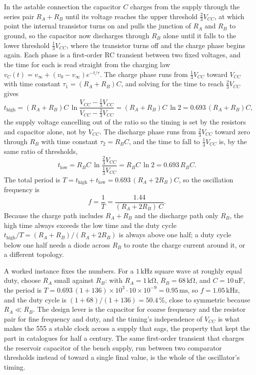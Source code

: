

In the astable connection the capacitor $C$ charges from the supply
through the series pair $R_A + R_B$ until its voltage reaches the upper
threshold $\tfrac{2}{3}V_{CC}$, at which point the internal transistor
turns on and pulls the junction of $R_A$ and $R_B$ to ground, so the
capacitor now discharges through $R_B$ alone until it falls to the lower
threshold $\tfrac{1}{3}V_{CC}$, where the transistor turns off and the
charge phase begins again. Each phase is a first-order RC transient
between two fixed voltages, and the time for each is read straight from
the charging law $v_C(t) = v_\infty + (v_0 - v_\infty)e^{-t/\tau}$. The
charge phase runs from $\tfrac{1}{3}V_{CC}$ toward $V_{CC}$ with time
constant $\tau_1 = (R_A + R_B)C$, and solving for the time to reach
$\tfrac{2}{3}V_{CC}$ gives
\[
t_{\text{high}} = (R_A + R_B)C\,\ln\!\frac{V_{CC} - \tfrac{1}{3}V_{CC}}
{V_{CC} - \tfrac{2}{3}V_{CC}}
= (R_A + R_B)C\,\ln 2 = 0.693\,(R_A + R_B)C,
\]
the supply voltage cancelling out of the ratio so the timing is set by the
resistors and capacitor alone, not by $V_{CC}$. The discharge phase runs
from $\tfrac{2}{3}V_{CC}$ toward zero through $R_B$ with time constant
$\tau_2 = R_B C$, and the time to fall to $\tfrac{1}{3}V_{CC}$ is, by the
same ratio of thresholds,
\[
t_{\text{low}} = R_B C\,\ln\!\frac{\tfrac{2}{3}V_{CC}}{\tfrac{1}{3}V_{CC}}
= R_B C\,\ln 2 = 0.693\,R_B C.
\]
The total period is $T = t_{\text{high}} + t_{\text{low}} = 0.693\,(R_A +
2R_B)C$, so the oscillation frequency is
\[
f = \frac{1}{T} = \frac{1.44}{(R_A + 2R_B)\,C}.
\]
Because the charge path includes $R_A + R_B$ and the discharge path only
$R_B$, the high time always exceeds the low time and the duty cycle
$t_{\text{high}}/T = (R_A + R_B)/(R_A + 2R_B)$ is always above one half; a
duty cycle below one half needs a diode across $R_B$ to route the charge
current around it, or a different topology.

A worked instance fixes the numbers. For a $1\,\si{\kilo\hertz}$ square
wave at roughly equal duty, choose $R_A$ small against $R_B$: with $R_A =
1\,\si{\kilo\ohm}$, $R_B = 68\,\si{\kilo\ohm}$, and $C = 10\,\si{\nano
\farad}$, the period is $T = 0.693\,(1 + 136)\times 10^{3}\cdot 10\times
10^{-9} = 0.95\,\si{\milli\second}$, so $f = 1.05\,\si{\kilo\hertz}$, and
the duty cycle is $(1 + 68)/(1 + 136) = 50.4\,\%$, close to symmetric
because $R_A \ll R_B$. The design lever is the capacitor for coarse
frequency and the resistor pair for fine frequency and duty, and the
timing's independence of $V_{CC}$ is what makes the 555 a stable clock
across a supply that sags, the property that kept the part in catalogues
for half a century. The same first-order transient that charges the
reservoir capacitor of the bench supply, run between two comparator
thresholds instead of toward a single final value, is the whole of the
oscillator's timing.

